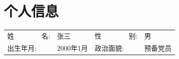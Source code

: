\begin{figure}[h]
    \begin{minipage}{0.82\textwidth}
        \section{\makebox[\widthof{\faAddressCard}][c]{\color{BUPT_Blue}{\faAddressCard}}\quad 个人信息}
        \begin{tabularx}{\linewidth}{p{}Xp{}X}
            姓\ \ \ \ \ \ \ \ 名: & 张三 & 
            性\ \ \ \ \ \ \ \ 别: & 男  \\
            出生年月: & 2000年1月 & 
            政治面貌: & 预备党员 \\
        \end{tabularx}
    \end{minipage}
    \hspace{2em}
    \begin{minipage}{0.12\textwidth}
        \setlength{\fboxsep}{0pt}
    \end{minipage}
\end{figure}
\vspace{-1em}

